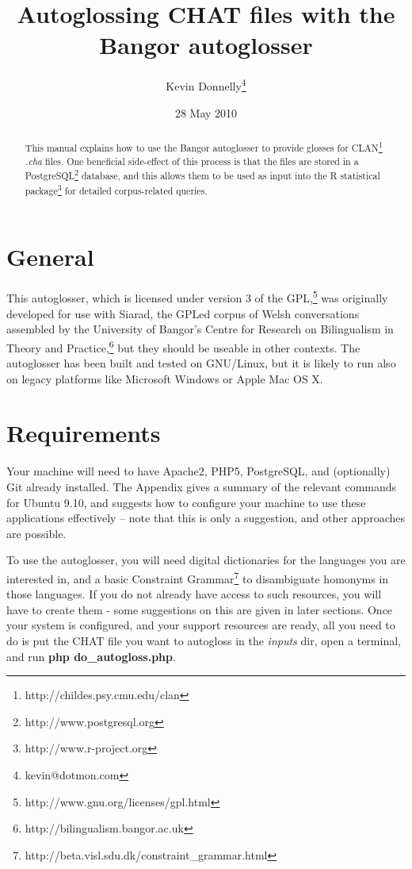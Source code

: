 \documentclass[a4paper,10pt]{article}
\title{\textbf{Autoglossing CHAT files with the Bangor autoglosser}}
\author{Kevin Donnelly\thanks{kevin@dotmon.com}}
\date{28 May 2010}
\begin{document}
\maketitle

\begin{abstract}
This manual explains how to use the Bangor autoglosser to provide glosses for  CLAN\footnote{http://childes.psy.cmu.edu/clan} \textit{.cha} files.  One beneficial side-effect of this process is that the files are stored in a PostgreSQL\footnote{http://www.postgresql.org} database, and this allows them to be used as input into the R statistical package\footnote{http://www.r-project.org} for detailed corpus-related queries.
\end{abstract}


\section{General}
\label{sec:general}

This autoglosser, which is licensed under version 3 of the GPL,\footnote{http://www.gnu.org/licenses/gpl.html} was originally developed for use with Siarad, the GPLed corpus of Welsh conversations assembled by the University of Bangor's Centre for Research on Bilingualism in Theory and Practice,\footnote{http://bilingualism.bangor.ac.uk} but they should be useable in other contexts.  The autoglosser has been built and tested on GNU/Linux, but it is likely to run also on legacy platforms like Microsoft Windows or Apple Mac OS X.


\section{Requirements}
\label{sec:requirements}

Your machine will need to have Apache2, PHP5, PostgreSQL, and (optionally) Git already installed.  The Appendix gives a summary of the relevant commands for Ubuntu 9.10, and suggests how to configure your machine to use these applications effectively -- note that this is only a suggestion, and other approaches are possible.

To use the autoglosser, you will need digital dictionaries for the languages you are interested in, and a basic Constraint Grammar\footnote{http://beta.visl.sdu.dk/constraint\_grammar.html} to disambiguate homonyms in those languages.  If you do not already have access to such resources, you will have to create them - some suggestions on this are given in later sections.   Once your system is configured, and your support resources are ready, all you need to do is put the CHAT file you want to autogloss in the \textit{inputs} dir, open a terminal, and run \textbf{php do\_autogloss.php}.
\end{document}

